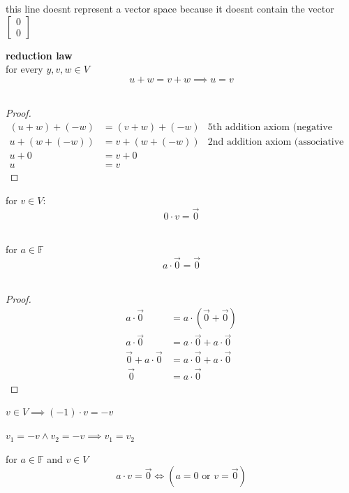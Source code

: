 \documentclass[a4paper,12pt]{article}
\begin{document}
\begin{definition}
\begin{my_example}
this line doesnt represent a vector space because it doesnt contain the vector \(\begin{bmatrix} 0\\ 0 \end{bmatrix}\)\\
\end{my_example}
\begin{lemma}
\textbf{reduction law}\\
for every \(y,v,w \in V\)\\
\[ u + w = v + w \implies u = v \]\\

\begin{proof}
\begin{align*}
  (u + w) + (-w) &= (v + w) + (-w) & \text{5th addition axiom (negative vector)}\\
  u + (w + (-w)) &= v + (w + (-w)) & \text{2nd addition axiom (associative property)}\\
  u + 0 &= v + 0\\
  u &= v
\end{align*}
\end{proof}
\end{lemma}
\begin{lemma}
for \(v \in V\):\\
\[ 0 \cdot v = \vec{0} \]\\
\end{lemma}
\begin{lemma}
for \(a \in \mathbb{F}\)\\
\[ a \cdot \vec0 = \vec0 \]\\

\begin{proof}
\begin{align*}
  a \cdot \vec0 &= a \cdot (\vec0 + \vec0)\\
  a \cdot \vec0 &= a \cdot \vec0 + a \cdot \vec0\\
  \vec0 + a \cdot \vec0 &= a \cdot \vec0 + a \cdot \vec0\\\
  \vec0 &= a \cdot \vec0
\end{align*}
\end{proof}
\end{lemma}
\begin{lemma}
\(v \in V \implies (-1) \cdot v = -v\)\\
\end{lemma}
\begin{lemma}
\(v_1 = -v \land v_2 = -v \implies v_1 = v_2\)\\
\end{lemma}
\begin{lemma}
for \(a \in \mathbb{F}\) and \(v \in V\)\\
\[ a \cdot v = \vec0 \iff (a = 0 \text{ or } v = \vec0) \]\\
\end{lemma}
\end{definition}
\end{document}
